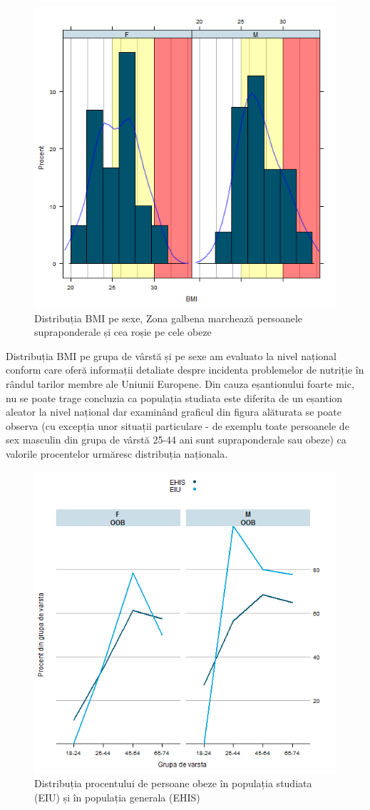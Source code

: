 \documentclass[11pt,draft]{article}
\begin{document}
    \begin{figure}[H]
	\centering
	\includegraphics[width=0.8\linewidth]{incobmiDens}
	\caption{Distribuția BMI pe sexe, Zona galbena marchează persoanele supraponderale și cea roșie pe cele obeze}
	\label{fig:incobmiDens}
    \end{figure}
  Distribuția BMI pe grupa de vârstă și pe sexe am evaluato la nivel național conform \citep{EHIS09} care oferă informații detaliate despre incidenta problemelor de nutriție în rândul tarilor membre ale Uniunii Europene. Din cauza eșantionului foarte mic, nu se poate trage concluzia ca populația studiata este diferita de un eșantion aleator la nivel național dar examinând graficul din figura alăturata se poate observa (cu excepția unor situații particulare - de exemplu toate persoanele de sex masculin din grupa de vârstă 25-44 ani sunt supraponderale sau obeze) ca valorile procentelor urmăresc distribuția naționala.
  \begin{figure}[H]
	\centering
	\includegraphics[width=0.8\linewidth]{incoBMIvsEHIS-OOB}
	\caption{Distribuția procentului de persoane obeze în populația studiata (EIU) și în populația generala (EHIS) }
	\label{fig:incoBMIvsEHIS-OOB}
  \end{figure}
  
\end{document}
